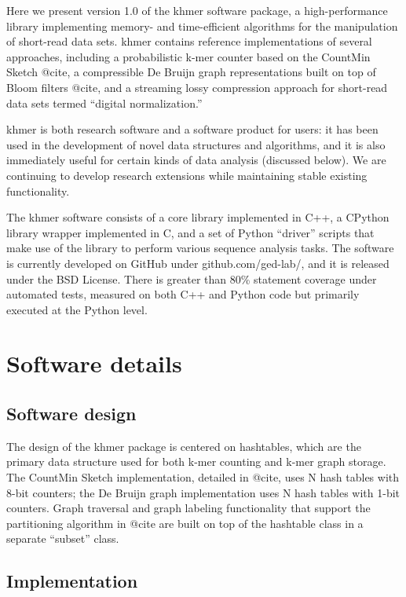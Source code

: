 \documentclass[10pt]{article}
\begin{document}
Here we present version 1.0 of the khmer software package, a
high-performance library implementing memory- and time-efficient
algorithms for the manipulation of short-read data sets.  khmer
contains reference implementations of several approaches, including a
probabilistic k-mer counter based on the CountMin Sketch @cite, a
compressible De Bruijn graph representations built on top of Bloom
filters @cite, and a streaming lossy compression approach for
short-read data sets termed ``digital normalization.''

khmer is both research software and a software product for users: it
has been used in the development of novel data structures and
algorithms, and it is also immediately useful for certain kinds of
data analysis (discussed below).  We are continuing to develop research
extensions while maintaining stable existing functionality.

The khmer software consists of a core library implemented in C++, a
CPython library wrapper implemented in C, and a set of Python
``driver'' scripts that make use of the library to perform various
sequence analysis tasks.  The software is currently developed on
GitHub under github.com/ged-lab/, and it is released under the BSD
License.  There is greater than 80\% statement coverage under
automated tests, measured on both C++ and Python code but primarily
executed at the Python level.

\section*{Software details}

\subsection*{Software design}

The design of the khmer package is centered on hashtables, which are
the primary data structure used for both k-mer counting and k-mer
graph storage.  The CountMin Sketch implementation, detailed in @cite,
uses N hash tables with 8-bit counters; the De Bruijn graph implementation
uses N hash tables with 1-bit counters.  Graph traversal and
graph labeling functionality that support the partitioning algorithm
in @cite are built on top of the hashtable class in a separate ``subset''
class.

\subsection*{Implementation}
\end{document}
